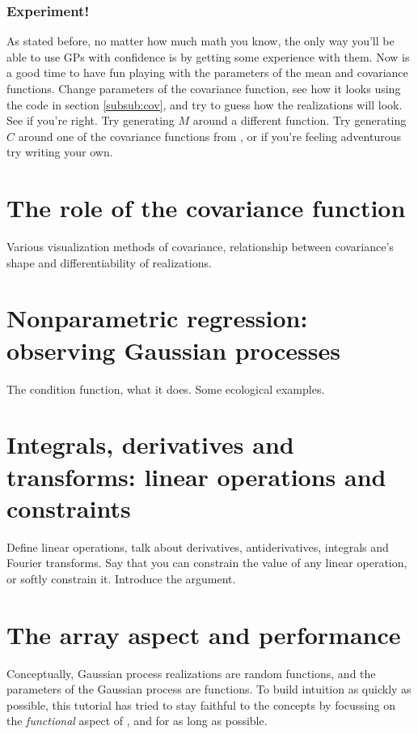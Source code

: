\documentclass{manual}
\begin{document}
\subsubsection{Experiment!} 

As stated before, no matter how much math you know, the only way you'll be able to use GPs with confidence is by getting some experience with them. Now is a good time to have fun playing with the parameters of the mean and covariance functions. Change parameters of the covariance function, see how it looks using the code in section \ref{subsub:cov}, and try to guess how the realizations will look. See if you're right. Try generating $M$ around a different function. Try generating $C$ around one of the covariance functions from , or if you're feeling adventurous try writing your own. 



\section{The role of the covariance function}\label{sec:cov} %

Various visualization methods of covariance, relationship between covariance's shape and differentiability of realizations.



\section{Nonparametric regression: observing Gaussian processes}\label{sec:observing} %

The condition function, what it does. Some ecological examples.



\section{Integrals, derivatives and transforms: linear operations and constraints}\label{sec:lin_op} %

Define linear operations, talk about derivatives, antiderivatives, integrals and Fourier transforms. Say that you can constrain the value of any linear operation, or softly constrain it. Introduce the  argument. 



\section{The array aspect and performance}\label{sec:array} %
Conceptually, Gaussian process realizations are random functions, and the parameters of the Gaussian process are functions. To build intuition as quickly as possible, this tutorial has tried to stay faithful to the concepts by focussing on the \emph{functional} aspect of ,  and  for as long as possible. 
\end{document}
